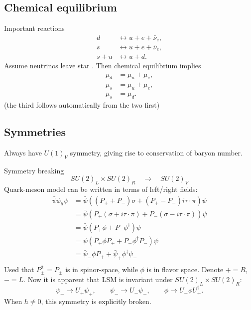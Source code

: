\subsection{Chemical equilibrium}


Important reactions
\begin{subequations}
\begin{align}
	d     &\leftrightarrow u + e + \bar{\nu}_e, \\
	s     &\leftrightarrow u + e + \bar{\nu}_e, \\
	s + u &\leftrightarrow u + d .
\end{align}
\end{subequations}
Assume neutrinos leave star .
Then chemical equilibrium implies
\begin{subequations}
\begin{align}
	\mu_d &= \mu_u + \mu_e, \\
	\mu_s &= \mu_u + \mu_e, \\
	\mu_s &= \mu_d .
\end{align}
\label{eq:lsm:chemical_equilibrium}
\end{subequations}
(the third follows automatically from the two first)

\subsection{Symmetries}

Always have $U(1)_V$ symmetry, giving rise to conservation of baryon number.

Symmetry breaking
\begin{equation}
	SU(2)_L \times SU(2)_R \quad \rightarrow \quad SU(2)_V
\end{equation}
Quark-meson model can be written in terms of left/right fields:
\begin{equation}
\begin{split}
	\bar{\psi} \phi_5 \psi &= \bar{\psi} ( (P_+ + P_-) \sigma + (P_+ - P_-) i \tau \cdot \pi) \psi \\
	                       &= \bar{\psi} ( P_+ (\sigma + i \tau \cdot \pi) + P_- (\sigma - i \tau \cdot \pi) ) \psi \\
	                       &= \bar{\psi} ( P_+ \phi + P_- \phi^\dagger) \psi \\
	                       &= \bar{\psi} ( P_+ \phi P_+ + P_- \phi^\dagger P_-) \psi \\
	                       &= \bar{\psi}_- \phi P_+ + \bar{\psi}_+ \phi^\dagger \psi_- \\
\end{split}
\end{equation}
Used that $P_\pm^2 = P_\pm$ is in spinor-space, while $\phi$ is in flavor space.
Denote $+ = R$, $- = L$.
Now it is apparent that LSM is invariant under $SU(2)_L \times SU(2)_R$:
\begin{equation}
	\psi_+ \rightarrow U_+ \psi_+, \qquad
	\psi_- \rightarrow U_- \psi_-, \qquad
	\phi   \rightarrow U_- \phi U_+^\dagger.
\end{equation}
When $h \neq 0$, this symmetry is explicitly broken.



